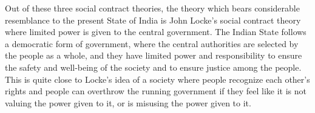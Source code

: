 \documentclass[12pt]{article}
\begin{document}
Out of these three social contract theories, the theory which bears considerable resemblance to the present State of India is John Locke's social contract theory where limited power is given to the central government. The Indian State follows a democratic form of government, where the central authorities are selected by the people as a whole, and they have limited power and responsibility to ensure the safety and well-being of the society and to ensure justice among the people. This is quite close to Locke's idea of a society where people recognize each other's rights and people can overthrow the running government if they feel like it is not valuing the power given to it, or is misusing the power given to it.



\end{document}
